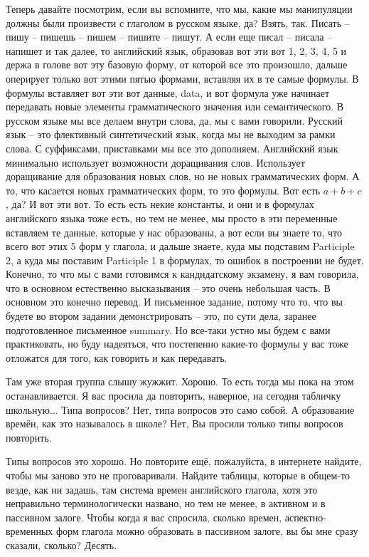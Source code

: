 \documentclass[main.tex]{subfiles}
\begin{document}
Теперь давайте посмотрим, если вы вспомните, что мы, какие мы манипуляции должны были произвести с глаголом в русском языке, да?
Взять, так.
Писать -- пишу -- пишешь -- пишем -- пишите -- пишут.
А если еще писал -- писала -- напишет и так далее, то английский язык, образовав вот эти вот 1, 2, 3, 4, 5 и держа в голове вот эту базовую форму, от которой все это произошло, дальше оперирует только вот этими пятью формами, вставляя их в те самые формулы.
В формулы вставляет вот эти вот данные, data, и вот формула уже начинает передавать новые элементы грамматического значения или семантического.
В русском языке мы все делаем внутри слова, да, мы с вами говорили.
Русский язык -- это флективный синтетический язык, когда мы не выходим за рамки слова.
С суффиксами, приставками мы все это дополняем.
Английский язык минимально использует возможности доращивания слов.
Использует доращивание для образования новых слов, но не новых грамматических форм.
А то, что касается новых грамматических форм, то это формулы.
Вот есть $a+b+c$, да? И вот эти вот.
То есть есть некие константы, и они и в формулах английского языка тоже есть, но тем не менее, мы просто в эти переменные вставляем те данные, которые у нас образованы, а вот если вы знаете то, что всего вот этих 5 форм у глагола, и дальше знаете, куда мы подставим Participle 2, а куда мы поставим Participle 1 в формулах, то ошибок в построении не будет.
Конечно, то что мы с вами готовимся к кандидатскому экзамену, я вам говорила, что в основном естественно высказывания -- это очень небольшая часть.
В основном это конечно перевод.
И письменное задание, потому что то, что вы будете во втором задании демонстрировать -- это, по сути дела, заранее подготовленное письменное summary.
Но все-таки устно мы будем с вами практиковать, но буду надеяться, что постепенно какие-то формулы у вас тоже отложатся для того, как говорить и как передавать.

Там уже вторая группа слышу жужжит.
Хорошо.
То есть тогда мы пока на этом останавливается.
Я вас просила да повторить, наверное, на сегодня табличку школьную...
Типа вопросов?
Нет, типа вопросов это само собой.
А образование времён, как это называлось в школе?
Нет, Вы просили только типы вопросов повторить.

Типы вопросов это хорошо.
Но повторите ещё, пожалуйста, в интернете найдите, чтобы мы заново это не проговаривали.
Найдите таблицы, которые в общем-то везде, как ни задашь, там система времен английского глагола, хотя это неправильно терминологически названо, но тем не менее, в активном и в пассивном залоге.
Чтобы когда я вас спросила, сколько времен, аспектно-временных форм глагола можно образовать в пассивном залоге, вы бы мне сразу сказали, сколько?
Десять.
\end{document}
